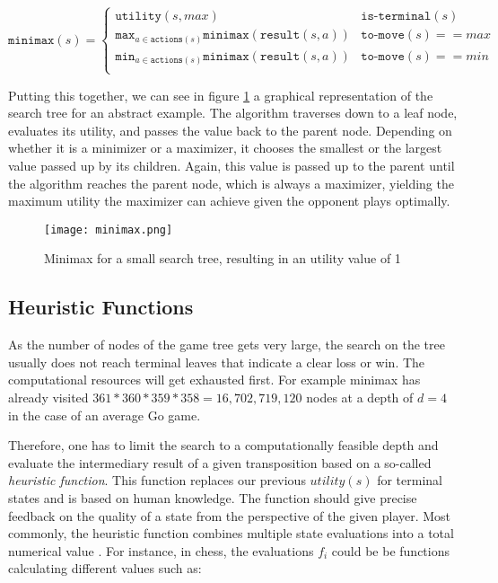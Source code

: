 \begin{equation}
    \texttt{minimax}(s) =
    \begin{cases}
        \texttt{utility}(s, max)                                                      & \texttt{is-terminal}(s)    \\
        \texttt{max}_{a\in\texttt{actions}(s)}\texttt{minimax}(\texttt{result}(s, a)) & \texttt{to-move}(s) == max \\
        \texttt{min}_{a\in\texttt{actions}(s)}\texttt{minimax}(\texttt{result}(s, a)) & \texttt{to-move}(s) == min \\
    \end{cases}
\end{equation}

Putting this together, we can see in figure \ref{minimax} a graphical representation of the search tree for an abstract example. The algorithm traverses down to a leaf node, evaluates its utility, and passes the value back to the parent node. Depending on whether it is a minimizer or a maximizer, it chooses the smallest or the largest value passed up by its children. Again, this value is passed up to the parent until the algorithm reaches the parent node, which is always a maximizer, yielding the maximum utility the maximizer can achieve given the opponent plays optimally.

\begin{figure}
    \centering
    \texttt{[image: minimax.png]}
    \caption{Minimax for a small search tree, resulting in an utility value of 1 \cite[cf. p. 303]{russell_artificial_2021}}
    \label{minimax}
\end{figure}

\subsection{Heuristic Functions}
As the number of nodes of the game tree gets very large, the search on the tree usually does not reach terminal leaves that indicate a clear loss or win. The computational resources will get exhausted first. For example minimax has already visited $ 361 * 360 * 359 * 358 = 16,702,719,120 $ nodes at a depth of $ d = 4 $ in the case of an average Go game.

Therefore, one has to limit the search to a computationally feasible depth and evaluate the intermediary result of a given transposition based on a so-called \textit{heuristic function}. This function replaces our previous $ utility(s) $ for terminal states and is based on human knowledge. The function should give precise feedback on the quality of a state from the perspective of the given player. Most commonly, the heuristic function combines multiple state evaluations into a total numerical value \cite[cf. p. 316]{russell_artificial_2021}. For instance, in chess, the evaluations $ f_i $ could be be functions calculating different values such as:

